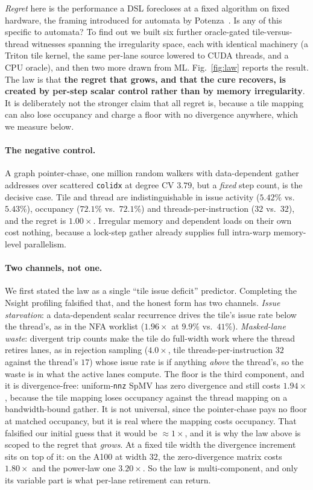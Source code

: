 \documentclass[sigplan,review,nonacm,10pt]{acmart}
\begin{document}
\emph{Regret} here is the performance a DSL forecloses at a fixed algorithm on fixed
hardware, the framing introduced for automata by Potenza~\cite{twofaces2026}.
Is any of this specific to automata? To find out we built six further oracle-gated
tile-versus-thread witnesses spanning the irregularity space, each with identical machinery
(a Triton tile kernel, the same per-lane source lowered to CUDA threads, and a CPU oracle),
and then two more drawn from ML. Fig.~\ref{fig:law} reports the result. The law is that
\textbf{the regret that grows, and that the cure recovers, is created by per-step scalar
control rather than by memory irregularity}. It is deliberately not the stronger claim that
all regret is, because a tile mapping can also lose occupancy and charge a floor with no
divergence anywhere, which we measure below.

\paragraph{The negative control.} A graph pointer-chase, one million random walkers with
data-dependent gather addresses over scattered \texttt{colidx} at degree CV $3.79$, but a
\emph{fixed} step count, is the decisive case. Tile and thread are indistinguishable in
issue activity ($5.42\%$ vs.\ $5.43\%$), occupancy ($72.1\%$ vs.\ $72.1\%$) and
threads-per-instruction ($32$ vs.\ $32$), and the regret is $1.00\times$. Irregular memory
and dependent loads on their own cost nothing, because a lock-step gather already supplies
full intra-warp memory-level parallelism.

\paragraph{Two channels, not one.} We first stated the law as a single ``tile issue
deficit'' predictor. Completing the Nsight profiling falsified that, and the honest form has
two channels. \emph{Issue starvation}: a data-dependent scalar recurrence drives the tile's
issue rate below the thread's, as in the NFA worklist ($1.96\times$ at $9.9\%$ vs.\ $41\%$).
\emph{Masked-lane waste}: divergent trip counts make the tile do full-width work where the
thread retires lanes, as in rejection sampling ($4.0\times$, tile threads-per-instruction
$32$ against the thread's $17$) whose issue rate is if anything \emph{above} the thread's,
so the waste is in what the active lanes compute. The floor is the third component, and it is
divergence-free: uniform-\texttt{nnz} SpMV has zero divergence and still costs
$1.94\times$, because the tile mapping loses occupancy against the thread mapping on a
bandwidth-bound gather. It is not universal, since the pointer-chase pays no floor at
matched occupancy, but it is real where the mapping costs occupancy. That falsified our
initial guess that it would be ${\approx}1\times$, and it is why the law above is scoped
to the regret that \emph{grows}. At a fixed tile width the divergence increment sits on top
of it: on the A100 at width $32$, the zero-divergence matrix costs $1.80\times$ and the
power-law one $3.20\times$. So the law is multi-component, and only its variable part is
what per-lane retirement can return.
\end{document}
